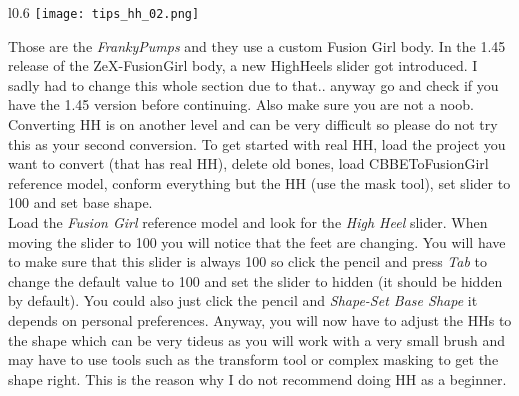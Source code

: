 \begin{wrapfigure}[14]{l}{0.6\textwidth}
    \vspace{-12pt}
    \texttt{[image: tips\_hh\_02.png]}
\end{wrapfigure}
Those are the \textit{FrankyPumps} and they use a custom Fusion Girl body. In the 1.45 release of the ZeX-FusionGirl body, a new 
HighHeels slider got introduced. I sadly had to change this whole section due to that.. anyway go and check if you have the 1.45 version
before continuing. Also make sure you are not a noob. Converting HH is on another level and can be very difficult so please do not try this 
as your second conversion.
\linebreak
\linebreak
To get started with real HH, load the project you want to convert (that has real HH), delete old bones, load CBBEToFusionGirl reference 
model, conform everything but the HH (use the mask tool), set slider to 100 and set base shape.\\
Load the \textit{Fusion Girl} reference model and look for the \textit{High Heel} slider. When moving the slider to 100 you will notice 
that the feet are changing. You will have to make sure that this slider is always 100 so click the pencil and press \textit{Tab} to change 
the default value to 100 and set the slider to hidden (it should be hidden by default). You could also just click the pencil and \textit{Shape-Set Base Shape}
it depends on personal preferences. Anyway, you will now have to adjust the HHs to the shape which can be very tideus as you will work 
with a very small brush and may have to use tools such as the transform tool or complex masking to get the shape right. This is the 
reason why I do not recommend doing HH as a beginner.
